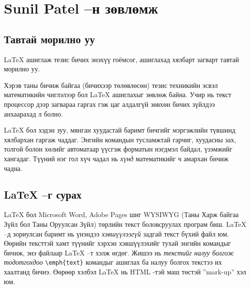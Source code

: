 
\chapter{Sunil Patel --н зөвлөмж} %
\label{Chapter1} %
\pagecolor{white}

\newcommand{\keyword}[1]{\textbf{#1}}
\newcommand{\tabhead}[1]{\textbf{#1}}
\newcommand{\code}[1]{\texttt{#1}}
\newcommand{\file}[1]{\texttt{\bfseries#1}}
\newcommand{\option}[1]{\texttt{\itshape#1}}


\section{Тавтай морилно уу}
\LaTeX{} ашиглаж тезис бичих энэхүү гоёмсог, ашиглахад хялбарт загварт тавтай морилно уу. 

Хэрэв таны бичиж байгаа (бичихээр төлөвлөсөн) тезис техникийн эсвэл математикийн чиглэлээр бол \LaTeX{} ашиглахыг зөвлөж байна. Учир нь текст процессор дээр загвараа гаргах гэж цаг алдалгүй зөвхөн бичих зүйлдээ анхаарахад л болно.

\LaTeX{} бол хэдэн зуу, мянган хуудастай баримт бичгийг мэргэжлийн түвшинд хялбархан гаргаж чаддаг. Энгийн командын тусламжтай гарчиг, хуудасны зах, толгой болон хөлийг автоматаар үүсгэж форматын нэгдмэл байдал, үзэмжийг хангадаг. Түүний нэг гол хүч чадал нь \emph{хүнд} математикийг ч амархан бичиж чадна.


\section{\LaTeX{} --г сурах}

\LaTeX{} бол Microsoft Word, Adobe Pages шиг \textsc{WYSIWYG} (Таны Харж байгаа Зүйл бол Таны Оруулсан Зүйл) төрлийн текст боловсруулах програм биш. \LaTeX{} --д зориулсан баримт нь үнэндээ \emph{хэвшүүлээгүй} задгай текст бүхий файл юм. Өөрийн тексттэй хамт түүнийг хэрхэн хэвшүүлэхийг тухай энгийн командыг бичиж, энэ файлаар \LaTeX{} --т хэлж өгдөг. Жишээ нь \emph{текстийг налуу болгож тодотгохдоо} \verb|\emph{text}| командыг ашиглах ба налуу болгох текстээ их хаалтанд бичнэ. Өөрөөр хэлбэл \LaTeX{} нь HTML -тэй маш төстэй ''{mark-up}'' хэл юм.

